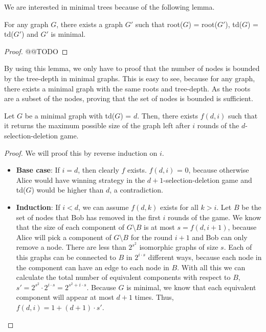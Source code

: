 We are interested in minimal trees because of the following lemma.

\begin{lemma}
For any graph $G$, there exists a graph $G'$ such that root($G$) = root($G'$), td($G$) = td($G'$) and $G'$ is minimal.
\end{lemma}
\begin{proof}
@@TODO
\end{proof}

By using this lemma, we only have to proof that the number of nodes is bounded  by the tree-depth in minimal graphs. This is easy to see, because for any graph, there exists a minimal graph with the same roots and tree-depth. As the roots are a subset of the nodes, proving that the set of nodes is bounded is sufficient.

\begin{lemma}
Let $G$ be a minimal graph with td($G$) = $d$. Then, there exists $f(d, i)$ such that it returns the maximum possible size of the graph left after $i$ rounds of the $d$-selection-deletion game.
\end{lemma}
\begin{proof}
We will proof this by reverse induction on $i$.
\begin{itemize}
  \item \textbf{Base case}: If $i = d$, then clearly $f$ exists. $f(d, i)$ = 0, because otherwise Alice would have winning strategy in the $d+1$-selection-deletion game and td($G$) would be higher than $d$, a contradiction.
  \item \textbf{Induction}: If $i < d$, we can assume $f(d, k)$ exists for all $k > i$. Let $B$ be the set of nodes that Bob has removed in the first $i$ rounds of the game. We know that the size of each component of $G \setminus B$ is at most $s = f(d, i+1)$, because Alice will pick a component of $G \setminus B$ for the round $i+1$ and Bob can only remove a node. There are less than $2^{s^2}$ isomorphic graphs of size $s$. Each of this graphs can be connected to $B$ in $2^{i \cdot s}$  different ways, because each node in the component can have an edge to each node in $B$. With all this we can calculate the total number of equivalent components with respect to $B$, $s' = 2^{s^2} \cdot 2^{i \cdot s} = 2^{s^2 + i \cdot s}$. Because $G$ is minimal, we know that each equivalent component will appear at most $d + 1$ times. Thus, $f(d, i) = 1 + (d+1) \cdot s'$.
\end{itemize}
\end{proof}

